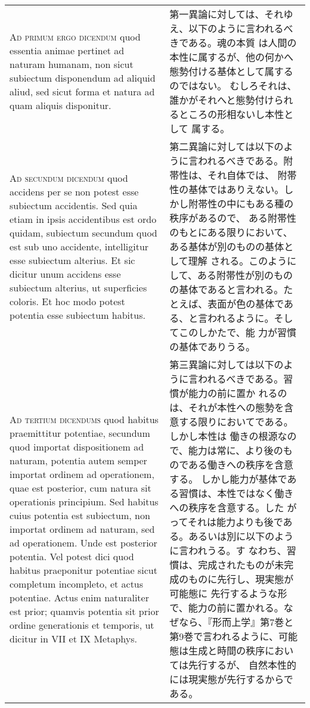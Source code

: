 \documentclass[10pt]{jsarticle} %
\begin{document}
\begin{longtable}{p{21em}p{21em}}


{\scshape Ad primum ergo dicendum} quod essentia animae pertinet ad naturam
humanam, non sicut subiectum disponendum ad aliquid aliud, sed sicut
forma et natura ad quam aliquis disponitur.

&

第一異論に対しては、それゆえ、以下のように言われるべきである。魂の本質
は人間の本性に属するが、他の何かへ態勢付ける基体として属するのではない。
むしろそれは、誰かがそれへと態勢付けられるところの形相ないし本性として
属する。

\\



{\scshape Ad secundum dicendum} quod accidens per se non potest esse subiectum
accidentis. Sed quia etiam in ipsis accidentibus est ordo quidam,
subiectum secundum quod est sub uno accidente, intelligitur esse
subiectum alterius. Et sic dicitur unum accidens esse subiectum
alterius, ut superficies coloris. Et hoc modo potest potentia esse
subiectum habitus.

&

第二異論に対しては以下のように言われるべきである。附帯性は、それ自体では、
附帯性の基体ではありえない。しかし附帯性の中にもある種の秩序があるので、
ある附帯性のもとにある限りにおいて、ある基体が別のものの基体として理解
される。このようにして、ある附帯性が別のものの基体であると言われる。た
とえば、表面が色の基体である、と言われるように。そしてこのしかたで、能
力が習慣の基体でありうる。

\\



{\scshape Ad tertium dicendums} quod habitus praemittitur potentiae, secundum quod
importat dispositionem ad naturam, potentia autem semper importat
ordinem ad operationem, quae est posterior, cum natura sit operationis
principium. Sed habitus cuius potentia est subiectum, non importat
ordinem ad naturam, sed ad operationem. Unde est posterior
potentia. Vel potest dici quod habitus praeponitur potentiae sicut
completum incompleto, et actus potentiae. Actus enim naturaliter est
prior; quamvis potentia sit prior ordine generationis et temporis, ut
dicitur in VII et IX Metaphys.

&

第三異論に対しては以下のように言われるべきである。習慣が能力の前に置か
れるのは、それが本性への態勢を含意する限りにおいてである。しかし本性は
働きの根源なので、能力は常に、より後のものである働きへの秩序を含意する。
しかし能力が基体である習慣は、本性ではなく働きへの秩序を含意する。した
がってそれは能力よりも後である。あるいは別に以下のように言われうる。す
なわち、習慣は、完成されたものが未完成のものに先行し、現実態が可能態に
先行するような形で、能力の前に置かれる。なぜなら、『形而上学』第7巻と
第9巻で言われるように、可能態は生成と時間の秩序においては先行するが、
自然本性的には現実態が先行するからである。


\end{longtable}
\newpage
\end{document}
